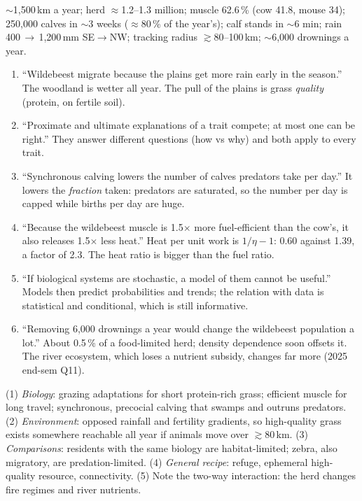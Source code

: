 \begin{numbers}
$\sim$1{,}500\,km a year; herd $\approx$1.2--1.3 million; muscle 62.6\,\% (cow 41.8, mouse 34); 250{,}000 calves in
$\sim$3 weeks ($\approx$80\,\% of the year's); calf stands in $\sim$6 min; rain 400\,$\to$\,1{,}200\,mm SE$\to$NW;
tracking radius $\gtrsim$80--100\,km; $\sim$6{,}000 drownings a year.
\end{numbers}

\begin{statements}
\begin{enumerate}[label=\arabic*.]
\item ``Wildebeest migrate because the plains get more rain early in the season.''
\F The woodland is wetter all year. The pull of the plains is grass \emph{quality} (protein, on fertile soil).
\item ``Proximate and ultimate explanations of a trait compete; at most one can be right.''
\F They answer different questions (how vs why) and both apply to every trait.
\item ``Synchronous calving lowers the number of calves predators take per day.''
\F It lowers the \emph{fraction} taken: predators are saturated, so the number per day is capped while births
per day are huge.
\item ``Because the wildebeest muscle is 1.5$\times$ more fuel-efficient than the cow's, it also releases 1.5$\times$ less heat.''
\F Heat per unit work is $1/\eta-1$: 0.60 against 1.39, a factor of 2.3. The heat ratio is bigger than the fuel ratio.
\item ``If biological systems are stochastic, a model of them cannot be useful.''
\F Models then predict probabilities and trends; the relation with data is statistical and conditional, which is
still informative.
\item ``Removing 6{,}000 drownings a year would change the wildebeest population a lot.''
\F About 0.5\,\% of a food-limited herd; density dependence soon offsets it. The river ecosystem, which loses a
nutrient subsidy, changes far more (2025 end-sem Q11).
\end{enumerate}
\end{statements}

\begin{longans}
(1) \emph{Biology}: grazing adaptations for short protein-rich grass; efficient muscle for long travel; synchronous,
precocial calving that swamps and outruns predators. (2) \emph{Environment}: opposed rainfall and fertility
gradients, so high-quality grass exists somewhere reachable all year if animals move over $\gtrsim$80\,km.
(3) \emph{Comparisons}: residents with the same biology are habitat-limited; zebra, also migratory, are
predation-limited. (4) \emph{General recipe}: refuge, ephemeral high-quality resource, connectivity. (5) Note the
two-way interaction: the herd changes fire regimes and river nutrients.
\end{longans}

